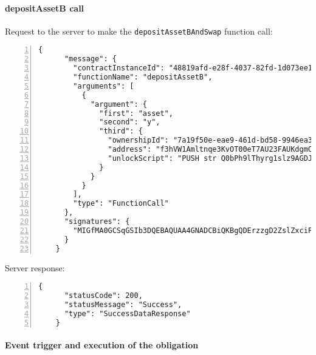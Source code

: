\paragraph{depositAssetB call}

Request to the server to make the \verb|depositAssetBAndSwap| function call:
{
  \small
  \begin{Verbatim}[numbers=left,xleftmargin=1cm,firstnumber=1,breaklines=true,breakanywhere=true,tabsize=2]
    {
      "message": {
        "contractInstanceId": "48819afd-e28f-4037-82fd-1d073ee1d318",
        "functionName": "depositAssetB",
        "arguments": [
          {
            "argument": {
              "first": "asset",
              "second": "y",
              "third": {
                "ownershipId": "7a19f50e-eae9-461d-bd58-9946ea39ccf0",
                "address": "f3hVW1Amltnqe3KvOT00eT7AU23FAUKdgmCluZB+nss=",
                "unlockScript": "PUSH str Q0bPh9lThyrg1slz9AGDJDJh1BecN9SlGCeVe3BqLod+zO7q0wvIy8tLognHNBkR8e8zKo6nWGQ8qZ7egjOmm5BQsqZzt8xL3gBbR36vgk9J3G9ObiTR2Dd7hMqsqyJnLT3aZUPXGc6RZoM/iUFGJUXhq2T6DStvYNKuAH+Lfow=\nPUSH str MIGfMA0GCSqGSIb3DQEBAQUAA4GNADCBiQKBgQDErzzgD2ZslZxciFAiX3/ot7lrkZDw4148jFZrsDZPE6CVs9xXFSHGgy/mFvIFLXhnChO6Nyd2be3lbgeavLMCMVUiTStXr117Km17keWpb3sItkKKsLFBOcIIU8XXowI/OhzQN2XPZYESHgjdQ5vwEj2YyueiS7WKP94YWz/pswIDAQAB\n"
              }
            }
          }
        ],
        "type": "FunctionCall"
      },
      "signatures": {
        "MIGfMA0GCSqGSIb3DQEBAQUAA4GNADCBiQKBgQDErzzgD2ZslZxciFAiX3/ot7lrkZDw4148jFZrsDZPE6CVs9xXFSHGgy/mFvIFLXhnChO6Nyd2be3lbgeavLMCMVUiTStXr117Km17keWpb3sItkKKsLFBOcIIU8XXowI/OhzQN2XPZYESHgjdQ5vwEj2YyueiS7WKP94YWz/pswIDAQAB": "VpIlGFopW81rCZ85cuFG+ks5UEhOz4Au8YGAtL7RDH+62l7Va159SCjiyy9y/FBTkYqgId74CC1jJnjfOdMiUy7jasgPa9JiJVUZSo5L/pq3e3pA5LWc4cb/8Yslu+Ax8zPmMzRwCPPu9/5jcowvtk06NcG1NNdW3Np5vP+M9vM="
      }
    }
  \end{Verbatim}
}

Server response:
{
  \small
  \begin{Verbatim}[numbers=left,xleftmargin=1cm,firstnumber=1,breaklines=true,breakanywhere=true,tabsize=2]
    {
      "statusCode": 200,
      "statusMessage": "Success",
      "type": "SuccessDataResponse"
    }
  \end{Verbatim}
}

\paragraph{Event trigger and execution of the obligation}

